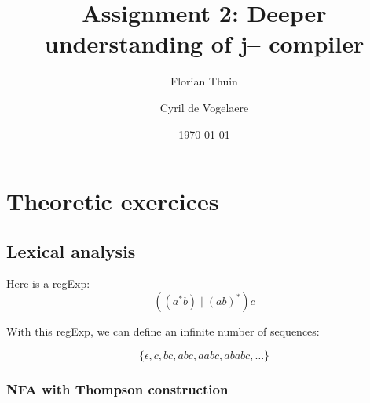 \documentclass[a4paper, 11pt]{article}
\author{Florian Thuin \and Cyril de Vogelaere}
\date{\today}
\title{Assignment 2: Deeper understanding of j-- compiler}
\begin{document}
    \maketitle
    \tableofcontents
    \clearpage{}

	\section{Theoretic exercices}
    \subsection{Lexical analysis}
    Here is a regExp:
    $$ ((a^{*}b) \mid {(ab)}^{*})c $$

    With this regExp, we can define an infinite number of sequences:

    $$ \{ \epsilon, c, bc, abc, aabc, ababc, \ldots \} $$

    \subsubsection{NFA with Thompson construction}
\end{document}
